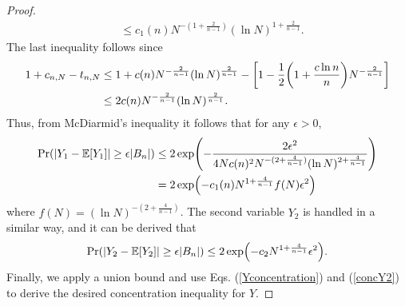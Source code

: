 \begin{proof}
\begin{align*}
	&\leq c_{1}(n)N^{-(1+\frac{2}{n-1})}(\ln N)^{1+\frac{2}{n-1}}.
	\end{align*}
	The last inequality follows since
	\begin{align*}
	1+c_{n,N}-t_{n,N} &\leq 1+c(n)\NN(\ln N)^{\frac{2}{n-1}}-\left[1-\frac{1}{2}\left(1+\frac{c\ln n}{n}\right)\NN\right]\\
	&\leq 2c(n)\NN(\ln N)^{\frac{2}{n-1}}.
	\end{align*}
	Thus, from McDiarmid's inequality it follows that for any $\epsilon > 0$,
	\begin{align}\label{Yconcentration}
	\Pr(|Y_1-\E[Y_1]| \geq \epsilon|B_n|) &\leq 2\exp\left(-\frac{2\epsilon^2}{4 N c(n)^2 N^{-(2+\frac{4}{n-1})}(\ln N)^{2+\frac{4}{n-1}}}\right) \nonumber\\
	&= 2\exp\left(-c_1(n)N^{1+\frac{4}{n-1}}f(N)\epsilon^2\right)
	\end{align}where $f(N)=(\ln N)^{-(2+\frac{4}{n-1})}$.
	The second variable $Y_2$   
	is handled in a similar way, and it can be derived that 
	\begin{equation}\label{concY2}
	\Pr(|Y_2-\E[Y_2]| \geq \epsilon |B_n|) \leq 2\exp\left(-c_2N^{1+\frac{4}{n-1}}\epsilon^2\right).
	\end{equation}
	Finally, we apply a union bound and use Eqs. (\ref{Yconcentration}) and (\ref{concY2}) to derive the desired concentration inequality for $Y$.
\end{proof}

